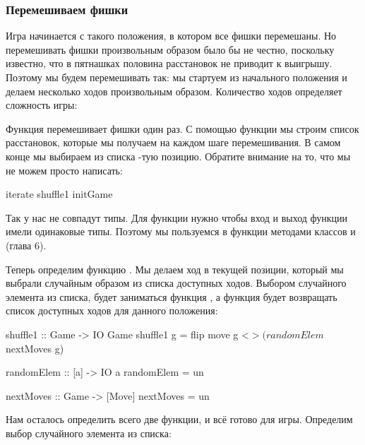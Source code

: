 \subsubsection{Перемешиваем фишки}

Игра начинается с такого положения, в котором все фишки перемешаны. Но
перемешивать фишки произвольным образом было бы не честно, поскольку
известно, что в пятнашках половина расстановок не приводит к выигрышу.
Поэтому мы будем перемешивать так: мы стартуем из начального положения и
делаем несколько ходов произвольным образом. Количество ходов определяет
сложность игры:



Функция  перемешивает фишки один раз. С помощью функции
 мы строим список расстановок, которые мы получаем на каждом
шаге перемешивания. В самом конце мы выбираем из списка -тую
позицию. Обратите внимание на то, что мы не можем просто написать:


\begin{code}
iterate shuffle1 initGame
\end{code}

Так у нас не совпадут типы. Для функции  нужно чтобы вход и
выход функции имели одинаковые типы. Поэтому мы пользуемся в функции
 методами классов  и  (глава 6).

Теперь определим функцию . Мы делаем ход в текущей позиции,
который мы выбрали случайным образом из списка доступных ходов. Выбором
случайного элемента из списка, будет заниматься функция ,
а функция  будет возвращать список доступных ходов для
данного положения:


\begin{code}
shuffle1 :: Game -> IO Game
shuffle1 g = flip move g <$> (randomElem $ nextMoves g)

randomElem :: [a] -> IO a
randomElem = un

nextMoves :: Game -> [Move]
nextMoves = un
\end{code}

Нам осталось определить всего две функции, и всё готово для игры.
Определим выбор случайного элемента из списка:


